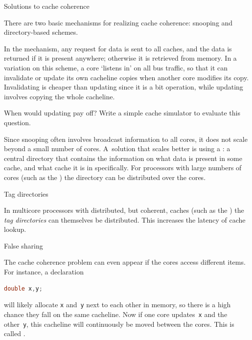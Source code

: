 
 {Solutions to cache coherence}

There are two basic  mechanisms for realizing cache coherence:
snooping and directory-based schemes.

In the  mechanism, any request for data is sent
to all caches, and the data is returned if it is present anywhere;
otherwise it is retrieved from memory. In a variation on this scheme,
a core 
`listens in' on all bus traffic, so that it can invalidate or update its own cacheline 
copies when another core modifies its copy. Invalidating is cheaper than updating
since it is a bit operation, while updating involves copying the whole cacheline.

\begin{exercise}
  When would updating pay off? Write a simple cache simulator to evaluate this question.
\end{exercise}

Since snooping often involves broadcast information to all cores, it
does not scale beyond a small number of cores. A~solution that scales
better is using a : a central directory
that contains the information on what data is present in some cache,
and what cache it is in specifically. For processors with large
numbers of cores (such as the ) the
directory can be distributed over the cores.

 {Tag directories}

In multicore processors with distributed, but coherent, caches
(such as the )
the
%
\emph{tag directories}
can themselves be distributed. This increases the latency of cache lookup.

 {False sharing}
\label{sec:falseshare}

The cache coherence problem can even appear if the cores access
different items. For instance, a declaration
\begin{lstlisting}[language=cpp]
  double x,y;
\end{lstlisting}
will likely allocate \lstinline{x} and~\lstinline{y} next to each other in memory, so
there is a high chance they fall on the same cacheline. Now if one
core updates~\lstinline{x} and the other~\lstinline{y}, this cacheline will
continuously be moved between the cores. This is called
.

